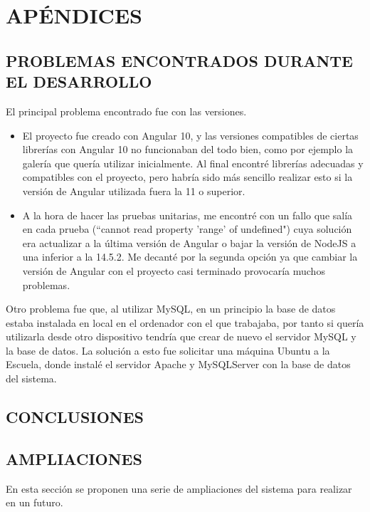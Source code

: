 \newpage
\chapter{APÉNDICES}
\newpage

\section{PROBLEMAS ENCONTRADOS DURANTE EL DESARROLLO}
El principal problema encontrado fue con las versiones. 
\begin{itemize}
\item El proyecto fue creado con Angular 10, y las versiones compatibles de ciertas librerías con Angular 10 no funcionaban del todo bien, como por ejemplo la galería que quería utilizar inicialmente. Al final encontré librerías adecuadas y compatibles con el proyecto, pero habría sido más sencillo realizar esto si la versión de Angular utilizada fuera la 11 o superior.
\item A la hora de hacer las pruebas unitarias, me encontré con un fallo que salía en cada prueba (``cannot read property 'range' of undefined") cuya solución era actualizar a la última versión de Angular o bajar la versión de NodeJS a una inferior a la 14.5.2. Me decanté por la segunda opción ya que cambiar la versión de Angular con el proyecto casi terminado provocaría muchos problemas.
\end{itemize}
\par Otro problema fue que, al utilizar MySQL, en un principio la base de datos estaba instalada en local en el ordenador con el que trabajaba, por tanto si quería utilizarla desde otro dispositivo tendría que crear de nuevo el servidor MySQL y la base de datos. La solución a esto fue solicitar una máquina Ubuntu a la Escuela, donde instalé el servidor Apache y MySQLServer con la base de datos del sistema.

\newpage
\section{CONCLUSIONES}



\newpage
\section{AMPLIACIONES} 
En esta sección se proponen una serie de ampliaciones del sistema para realizar en un futuro.
